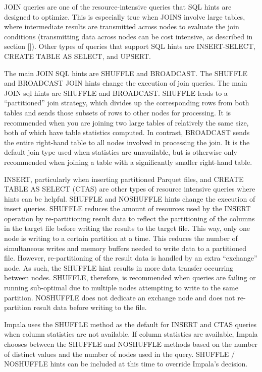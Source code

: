 \documentclass[onecolumn, draftclsnofoot,10pt, compsoc]{IEEEtran}
\begin{document}
JOIN queries are one of the resource-intensive queries that SQL hints are designed to optimize. This is especially true when JOINS involve large tables, where intermediate results are transmitted across nodes to evaluate the join conditions (transmitting data across nodes can be cost intensive, as described in section []). 
Other types of queries that support SQL hints are INSERT-SELECT, CREATE TABLE AS SELECT, and UPSERT. 

The main JOIN SQL hints are SHUFFLE and BROADCAST. 
The SHUFFLE and BROADCAST JOIN hints change the execution of join queries. The main JOIN sql hints are SHUFFLE and BROADCAST. 
SHUFFLE leads to a “partitioned” join strategy, which divides up the corresponding rows from both tables and sends those subsets of rows to other nodes for processing.
It is recommended when you are joining two large tables of relatively the same size, both of which have table statistics computed. In contrast, BROADCAST sends the entire right-hand table to all nodes involved in processing the join. 
It is the default join type used when statistics are unavailable, but is otherwise only recommended when joining a table with a significantly smaller right-hand table. 

INSERT, particularly when inserting partitioned Parquet files, and CREATE TABLE AS SELECT (CTAS) are other types of resource intensive queries where hints can be helpful. 
SHUFFLE and NOSHUFFLE hints change the execution of insert queries. SHUFFLE reduces the amount of resources used by the INSERT operation by re-partitioning result data to reflect the partitioning of the columns in the target file before writing the results to the target file. 
This way, only one node is writing to a certain partition at a time. This reduces the number of simultaneous writes and memory buffers needed to write data to a partitioned file. 
However, re-partitioning of the result data is handled by an extra “exchange” node. As such, the SHUFFLE hint results in more data transfer occurring between nodes. SHUFFLE, therefore, is recommended when queries are failing or running sub-optimal due to multiple nodes attempting to write to the same partition. 
NOSHUFFLE does not dedicate an exchange node and does not re-partition result data before writing to the file. 

Impala uses the SHUFFLE method as the default for INSERT and CTAS queries when column statistics are not available. If column statistics are available, Impala chooses between the SHUFFLE and NOSHUFFLE methods based on the number of distinct values and the number of nodes used in the query. 
SHUFFLE / NOSHUFFLE hints can be included at this time to override Impala’s decision. 
\end{document}
